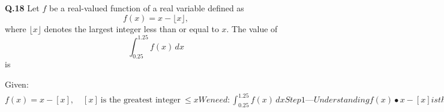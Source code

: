 \documentclass{article}
\begin{document}
\noindent
\textbf{Q.18} \quad Let \( f \) be a real-valued function of a real variable defined as 
\[
f(x) = x - \lfloor x \rfloor,
\]
where \( \lfloor x \rfloor \) denotes the largest integer less than or equal to \( x \). The value of 
\[
\int_{0.25}^{1.25} f(x) \, dx
\]
is

Given:
$ f(x) = x - [x], \quad [x] \ \text{is the greatest integer} \ \le x
We need:
\int_{0.25}^{1.25} f(x) \, dx
Step 1 — Understanding f(x)
 • x - [x] is the fractional part of x, denoted \{x\}.
 • \{x\} \in [0,1).
 • It repeats in each interval [n, n+1).
Step 2 — Splitting the Interval

The interval [0.25, 1.25] crosses the integer 1, so split at x = 1:
\int_{0.25}^{1.25} f(x) \, dx
= \int_{0.25}^{1} f(x) \, dx + \int_{1}^{1.25} f(x) \, dx

Step 3 — First Interval [0.25, 1)

For 0.25 \le x < 1:
[x] = 0 \quad \Rightarrow \quad f(x) = x
So:
\int_{0.25}^{1} x \, dx = \left[ \frac{x^2}{2} \right]_{0.25}^{1}
= \frac{1^2}{2} - \frac{(0.25)^2}{2}
= 0.5 - 0.03125
= 0.46875

Step 4 — Second Interval [1, 1.25]

For 1 \le x \le 1.25:
[x] = 1 \quad \Rightarrow \quad f(x) = x - 1
So:
\int_{1}^{1.25} (x - 1) \, dx
= \left[ \frac{x^2}{2} - x \right]_{1}^{1.25}
= \left(0.78125 - 1.25\right) - \left(0.5 - 1\right)
= -0.46875 - (-0.5)
= 0.03125

Step 5 — Adding Both Parts

\text{Total} = 0.46875 + 0.03125 = 0.50$
\end{document}
